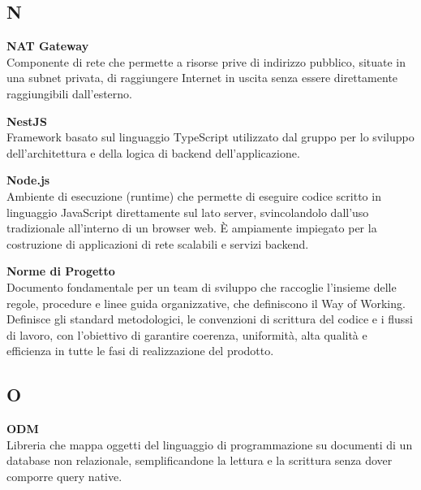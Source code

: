 \documentclass[12pt, a4paper]{article}
\begin{document}
\newpage
\subsection*{N}
{}
\vspace{0.2cm}

\noindent\hypertarget{nat-gateway}{\textbf{NAT Gateway}} \\[0.1em]
Componente di rete che permette a risorse prive di indirizzo pubblico, situate in una subnet privata, di raggiungere Internet in uscita senza essere direttamente raggiungibili dall'esterno.
\vspace{0.5cm}

\noindent\hypertarget{nestjs}{\textbf{NestJS}} \\[0.1em]
Framework basato sul linguaggio TypeScript utilizzato dal gruppo per lo sviluppo dell'architettura e della logica di backend dell'applicazione.
\vspace{0.5cm}  

\noindent\hypertarget{node-js}{\textbf{Node.js}} \\[0.1em]
Ambiente di esecuzione (runtime) che permette di eseguire codice scritto in linguaggio JavaScript direttamente sul lato server, svincolandolo dall'uso tradizionale all'interno di un browser web. È ampiamente impiegato per la costruzione di applicazioni di rete scalabili e servizi backend.
\vspace{0.5cm}

\noindent\hypertarget{norme-di-progetto}{\textbf{Norme di Progetto}} \\[0.1em]
Documento fondamentale per un team di sviluppo che raccoglie l'insieme delle regole, procedure e linee guida organizzative, che definiscono il Way of Working. Definisce gli standard metodologici, le convenzioni di scrittura del codice e i flussi di lavoro, con l'obiettivo di garantire coerenza, uniformità, alta qualità e efficienza in tutte le fasi di realizzazione del prodotto.
\vspace{0.1cm}

\newpage
\subsection*{O}
{}
\vspace{0.2cm}

\noindent\hypertarget{odm}{\textbf{ODM}} \\[0.1em]
Libreria che mappa oggetti del linguaggio di programmazione su documenti di un database non relazionale, semplificandone la lettura e la scrittura senza dover comporre query native.
\vspace{0.5cm}
\end{document}
